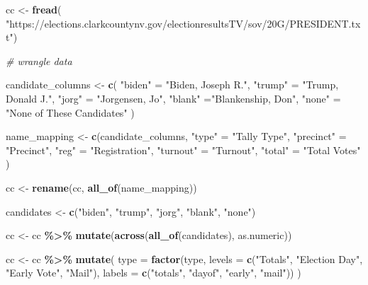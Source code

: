 \documentclass[10pt]{article}
\newenvironment{Shaded}{\begin{snugshade}}{\end{snugshade}}
\newcommand{\AttributeTok}[1]{\textcolor[rgb]{0.13,0.29,0.53}{#1}}
\newcommand{\CommentTok}[1]{\textcolor[rgb]{0.56,0.35,0.01}{\textit{#1}}}
\newcommand{\FunctionTok}[1]{\textcolor[rgb]{0.13,0.29,0.53}{\textbf{#1}}}
\newcommand{\NormalTok}[1]{#1}
\newcommand{\OtherTok}[1]{\textcolor[rgb]{0.56,0.35,0.01}{#1}}
\newcommand{\SpecialCharTok}[1]{\textcolor[rgb]{0.81,0.36,0.00}{\textbf{#1}}}
\newcommand{\StringTok}[1]{\textcolor[rgb]{0.31,0.60,0.02}{#1}}
\begin{document}
\begin{Shaded}
\begin{Highlighting}[]
\NormalTok{cc }\OtherTok{\textless{}{-}} \FunctionTok{fread}\NormalTok{(}
  \StringTok{"https://elections.clarkcountynv.gov/electionresultsTV/sov/20G/PRESIDENT.txt"}\NormalTok{)}

\CommentTok{\# wrangle data}

\NormalTok{candidate\_columns }\OtherTok{\textless{}{-}} \FunctionTok{c}\NormalTok{(}
  \StringTok{"biden"} \OtherTok{=} \StringTok{"Biden, Joseph R."}\NormalTok{,}
  \StringTok{"trump"} \OtherTok{=} \StringTok{"Trump, Donald J."}\NormalTok{,}
  \StringTok{"jorg"}  \OtherTok{=} \StringTok{"Jorgensen, Jo"}\NormalTok{,}
  \StringTok{"blank"} \OtherTok{=}\StringTok{"Blankenship, Don"}\NormalTok{,}
  \StringTok{"none"}  \OtherTok{=} \StringTok{"None of These Candidates"}
\NormalTok{)}

\NormalTok{name\_mapping }\OtherTok{\textless{}{-}} \FunctionTok{c}\NormalTok{(candidate\_columns,}
  \StringTok{"type"}     \OtherTok{=} \StringTok{"Tally Type"}\NormalTok{,}
  \StringTok{"precinct"} \OtherTok{=} \StringTok{"Precinct"}\NormalTok{,}
  \StringTok{"reg"}      \OtherTok{=} \StringTok{"Registration"}\NormalTok{,}
  \StringTok{"turnout"}  \OtherTok{=} \StringTok{"Turnout"}\NormalTok{,}
  \StringTok{"total"}    \OtherTok{=} \StringTok{"Total Votes"}
\NormalTok{)}

\NormalTok{cc }\OtherTok{\textless{}{-}} \FunctionTok{rename}\NormalTok{(cc, }\FunctionTok{all\_of}\NormalTok{(name\_mapping))}

\NormalTok{candidates }\OtherTok{\textless{}{-}} \FunctionTok{c}\NormalTok{(}\StringTok{"biden"}\NormalTok{, }\StringTok{"trump"}\NormalTok{, }\StringTok{"jorg"}\NormalTok{, }\StringTok{"blank"}\NormalTok{, }\StringTok{"none"}\NormalTok{)}

\NormalTok{cc }\OtherTok{\textless{}{-}}\NormalTok{ cc }\SpecialCharTok{\%\textgreater{}\%}
  \FunctionTok{mutate}\NormalTok{(}\FunctionTok{across}\NormalTok{(}\FunctionTok{all\_of}\NormalTok{(candidates), as.numeric))}

\NormalTok{cc }\OtherTok{\textless{}{-}}\NormalTok{ cc }\SpecialCharTok{\%\textgreater{}\%}
  \FunctionTok{mutate}\NormalTok{(}
    \AttributeTok{type =} \FunctionTok{factor}\NormalTok{(type, }
                  \AttributeTok{levels =} \FunctionTok{c}\NormalTok{(}\StringTok{"Totals"}\NormalTok{, }\StringTok{"Election Day"}\NormalTok{, }\StringTok{"Early Vote"}\NormalTok{, }\StringTok{"Mail"}\NormalTok{),}
                  \AttributeTok{labels =} \FunctionTok{c}\NormalTok{(}\StringTok{"totals"}\NormalTok{, }\StringTok{"dayof"}\NormalTok{, }\StringTok{"early"}\NormalTok{, }\StringTok{"mail"}\NormalTok{))}
\NormalTok{  )}


\end{Highlighting}
\end{Shaded}
\end{document}
